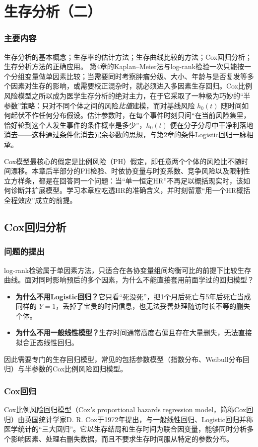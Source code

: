 \chapter{生存分析（二）}
\subsection*{主要内容}
生存分析的基本概念；生存率的估计方法；生存曲线比较的方法；Cox回归分析；生存分析方法的正确应用。
第4章的Kaplan--Meier法与log-rank检验一次只能按一个分组变量做单因素比较；当需要同时考察肿瘤分级、大小、年龄与是否复发等多个因素对生存的影响，或需要校正混杂时，就必须进入多因素生存回归。Cox比例风险模型之所以成为医学生存分析的绝对主力，在于它采取了一种极为巧妙的“半参数”策略：只对不同个体之间的风险\emph{比值}建模，而对基线风险 $h_0(t)$ 随时间如何起伏不作任何分布假设。估计参数时，在每个事件时刻只问“在当前风险集里，恰好轮到这个人发生事件的条件概率是多少”，$h_0(t)$ 便在分子分母中干净利落地消去——这种通过条件化消去冗余参数的思想，与第2章的条件Logistic回归一脉相承。

Cox模型最核心的假定是比例风险（PH）假定，即任意两个个体的风险比不随时间漂移。本章后半部分的PH检验、时依协变量与时变系数、竞争风险以及限制性立方样条，都是在回答同一个问题：当“单一恒定HR”不再足以概括现实时，该如何诊断并扩展模型。学习本章应吃透HR的准确含义，并时刻留意“用一个HR概括全程效应”成立的前提。
\section{Cox回归分析}
\subsection{问题的提出}
log-rank检验属于单因素方法，只适合在各协变量组间均衡可比的前提下比较生存曲线。面对同时影响预后的多个因素，为什么不能直接套用前面学过的回归模型？
\begin{itemize}
\item \textbf{为什么不用Logistic回归？}它只看“死没死”，把1个月后死亡与5年后死亡当成同样的 $Y=1$，丢掉了宝贵的时间信息，也无法妥善处理随访时长不等的删失个体。
\item \textbf{为什么不用一般线性模型？}生存时间通常高度右偏且存在大量删失，无法直接拟合正态线性回归。
\end{itemize}
因此需要专门的生存回归模型，常见的包括参数模型（指数分布、Weibull分布回归）与半参数的Cox比例风险回归模型。
\subsection{Cox回归}
Cox比例风险回归模型（Cox's proportional hazards regression model，简称Cox回归）由英国统计学家D. R. Cox于1972年提出，与一般线性回归、Logistic回归并称医学统计的“三大回归”。它以生存结局和生存时间为联合因变量，能够同时分析多个影响因素、处理右删失数据，而且不要求生存时间服从特定的参数分布。
